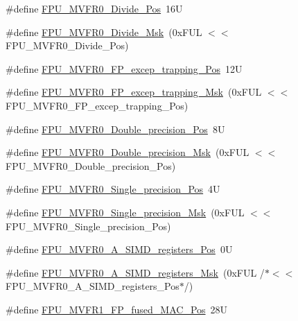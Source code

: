 \begin{DoxyCompactItemize}
\#define \hyperlink{group___c_m_s_i_s___f_p_u_ga167be203091e6cc7d00ad40ca48c4396}{F\+P\+U\+\_\+\+M\+V\+F\+R0\+\_\+\+Divide\+\_\+\+Pos}~16U
\item 
\#define \hyperlink{group___c_m_s_i_s___f_p_u_gaeb7370768c6cdf06f8a15c86c6102ed2}{F\+P\+U\+\_\+\+M\+V\+F\+R0\+\_\+\+Divide\+\_\+\+Msk}~(0x\+F\+U\+L $<$$<$ F\+P\+U\+\_\+\+M\+V\+F\+R0\+\_\+\+Divide\+\_\+\+Pos)
\item 
\#define \hyperlink{group___c_m_s_i_s___f_p_u_ga5c0715c41c4470f8bb0b6dcd34707f1c}{F\+P\+U\+\_\+\+M\+V\+F\+R0\+\_\+\+F\+P\+\_\+excep\+\_\+trapping\+\_\+\+Pos}~12U
\item 
\#define \hyperlink{group___c_m_s_i_s___f_p_u_ga29bbddd679e821e050699fda23e6c85e}{F\+P\+U\+\_\+\+M\+V\+F\+R0\+\_\+\+F\+P\+\_\+excep\+\_\+trapping\+\_\+\+Msk}~(0x\+F\+U\+L $<$$<$ F\+P\+U\+\_\+\+M\+V\+F\+R0\+\_\+\+F\+P\+\_\+excep\+\_\+trapping\+\_\+\+Pos)
\item 
\#define \hyperlink{group___c_m_s_i_s___f_p_u_ga461e26147be0c39402a78cb6249e8f84}{F\+P\+U\+\_\+\+M\+V\+F\+R0\+\_\+\+Double\+\_\+precision\+\_\+\+Pos}~8U
\item 
\#define \hyperlink{group___c_m_s_i_s___f_p_u_ga3f2c8c6c759ffe70f548a165602ea901}{F\+P\+U\+\_\+\+M\+V\+F\+R0\+\_\+\+Double\+\_\+precision\+\_\+\+Msk}~(0x\+F\+U\+L $<$$<$ F\+P\+U\+\_\+\+M\+V\+F\+R0\+\_\+\+Double\+\_\+precision\+\_\+\+Pos)
\item 
\#define \hyperlink{group___c_m_s_i_s___f_p_u_ga1b4e9fe31992b1495c7a158747d42571}{F\+P\+U\+\_\+\+M\+V\+F\+R0\+\_\+\+Single\+\_\+precision\+\_\+\+Pos}~4U
\item 
\#define \hyperlink{group___c_m_s_i_s___f_p_u_ga95008f205c9d25e4ffebdbdc50d5ae44}{F\+P\+U\+\_\+\+M\+V\+F\+R0\+\_\+\+Single\+\_\+precision\+\_\+\+Msk}~(0x\+F\+U\+L $<$$<$ F\+P\+U\+\_\+\+M\+V\+F\+R0\+\_\+\+Single\+\_\+precision\+\_\+\+Pos)
\item 
\#define \hyperlink{group___c_m_s_i_s___f_p_u_gaa1de44af3e3162c8c176a57564611618}{F\+P\+U\+\_\+\+M\+V\+F\+R0\+\_\+\+A\+\_\+\+S\+I\+M\+D\+\_\+registers\+\_\+\+Pos}~0U
\item 
\#define \hyperlink{group___c_m_s_i_s___f_p_u_ga118f13f9562805356e92b5ad52573021}{F\+P\+U\+\_\+\+M\+V\+F\+R0\+\_\+\+A\+\_\+\+S\+I\+M\+D\+\_\+registers\+\_\+\+Msk}~(0x\+F\+U\+L /$\ast$$<$$<$ F\+P\+U\+\_\+\+M\+V\+F\+R0\+\_\+\+A\+\_\+\+S\+I\+M\+D\+\_\+registers\+\_\+\+Pos$\ast$/)
\item 
\#define \hyperlink{group___c_m_s_i_s___f_p_u_ga68c53771f02f4c73122a7b40796549cc}{F\+P\+U\+\_\+\+M\+V\+F\+R1\+\_\+\+F\+P\+\_\+fused\+\_\+\+M\+A\+C\+\_\+\+Pos}~28U

\end{DoxyCompactItemize}
